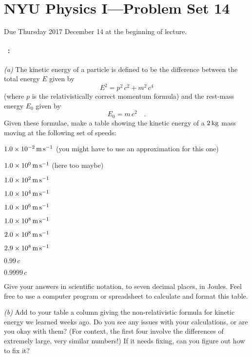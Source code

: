 \documentclass[12pt]{article}
\begin{document}
\section*{NYU Physics I---Problem Set 14}

Due Thursday 2017 December 14 at the beginning of lecture.

\paragraph{\problemname~\theproblem:}%
\textsl{(a)} The kinetic energy of a particle is defined to be the difference between the
total energy $E$ given by
\begin{equation}
E^2 = p^2\,c^2 + m^2\,c^4
\end{equation}
(where $p$ is the relativistically correct momentum formula) and the
rest-mass energy $E_0$ given by
\begin{equation}
E_0 = m\,c^2 \quad.
\end{equation}
Given these formulae, make a table showing the kinetic energy of a $2\,\mathrm{kg}$ mass
moving at the following set of speeds:
\begin{trivlist}
\item $1.0\times10^{-2}\,\mathrm{m}\,\mathrm{s}^{-1}$ (you might have to use an approximation for this one)
\item $1.0\times10^0\,\mathrm{m}\,\mathrm{s}^{-1}$ (here too maybe)
\item $1.0\times10^2\,\mathrm{m}\,\mathrm{s}^{-1}$
\item $1.0\times10^4\,\mathrm{m}\,\mathrm{s}^{-1}$
\item $1.0\times10^6\,\mathrm{m}\,\mathrm{s}^{-1}$
\item $1.0\times10^8\,\mathrm{m}\,\mathrm{s}^{-1}$
\item $2.0\times10^8\,\mathrm{m}\,\mathrm{s}^{-1}$
\item $2.9\times10^8\,\mathrm{m}\,\mathrm{s}^{-1}$
\item $0.99\,c$
\item $0.9999\,c$
\end{trivlist}
Give your answers in scientific notation, to seven decimal places, in Joules. Feel free to use
a computer program or spreadsheet to calculate and format this table.

\textsl{(b)} Add to your table a column giving the non-relativistic
formula for kinetic energy we learned weeks ago. Do you see any issues
with your calculations, or are you okay with them? (For context, the
first four involve the differences of extremely large, very similar
numbers!) If it needs fixing, can you figure out how to fix it?
\end{document}

